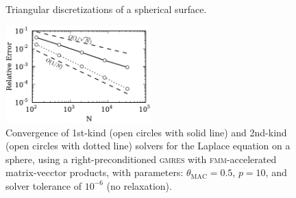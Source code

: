 \documentclass[final,leqno,]{siamltex1213}
\newcommand{\fmm}{\textsc{fmm}\xspace}
\newcommand{\gmres}{\textsc{gmres}\xspace}
\begin{document}
\begin{figure}[h]
\begin{center}
	\qquad
	\caption{Triangular discretizations of a spherical surface.}
	\label{fig:glob_spheres}
\end{center}
\end{figure}
%
\begin{figure}[t]
\begin{center}
	\includegraphics[natwidth=3in,natheight=2in,width=0.5\textwidth]{LaplaceConvergence.pdf}
	\caption{Convergence of 1st-kind (open circles with solid line) and 2nd-kind (open circles with dotted line) solvers for the Laplace equation on a sphere, using a right-preconditioned \gmres with \fmm-accelerated matrix-vecctor products, with parameters: $\theta_{\text{MAC}} = 0.5$, $p=10$, and solver tolerance of $10^{-6}$ (no relaxation).}
	\label{fig:laplaceconvergence}
\end{center}
\end{figure}
\end{document}
